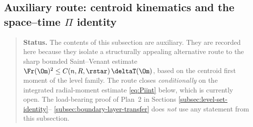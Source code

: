 %
%
%

\subsection{Auxiliary route: centroid kinematics and the space--time
\texorpdfstring{$\Pi$}{Pi} identity}
\label{subsec:plan2-aux-centroid}

\begin{quote}\small
\textbf{Status.}
The contents of this subsection are auxiliary. They are recorded here
because they isolate a structurally appealing alternative route to the
sharp bounded Saint--Venant estimate
$\Fr(\Om)^{2}\le C(n,R,\rstar)\,\deltaT(\Om)$,
based on the centroid first moment of the level family. The route
closes \emph{conditionally} on the integrated radial-moment estimate
\eqref{eq:Piint} below, which is currently open. The load-bearing
proof of Plan~2 in Sections \ref{subsec:level-set-identity}--%
\ref{subsec:boundary-layer-transfer} does \emph{not} use any
statement from this subsection.
\end{quote}

